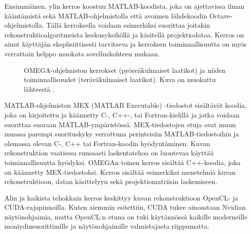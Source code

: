 Ensimmäinen, ylin kerros koostuu MATLAB-koodista, joka on ajettavissa ilman kääntämistä sekä MATLAB-ohjelmistolla että avoimen lähdekoodin Octave-ohjelmistolla. Tällä kerroksella voidaan esimerkiksi suorittaa joitakin rekonstruktioalgoritmeista keskusyksiköllä ja käsitellä projektiodataa. Kerros on ainut käyttäjän eksplisiittisesti tarvitseva ja kerroksen toiminnallisuutta on myös verrattain helppo muokata sovelluskohteen mukaan.\cite{wettenhovi_transmission_2021, wettenhovi_omegaopen-source_2021}

\begin{figure}[H]
    \centering
    \captionsetup{width=.9\textwidth}
    \resizebox{.9\linewidth}{!}{
        
    }
    \caption{OMEGA-ohjelmiston kerrokset (pyöreäkulmaiset laatikot) ja niiden toiminnallisuudet (teräväkulmaiset laatikot). Kuva on muokattu lähteestä \cite{wettenhovi_omegaopen-source_2021}.}
    \label{fig:omega-kerrokset}
\end{figure}

MATLAB-ohjelmiston MEX (MATLAB Executable) -tiedostot sisältävät koodia, joka on kirjoitettu ja käännetty C-, C++-, tai Fortran-kielillä ja jotka voidaan suorittaa suoraan MATLAB-ympäristössä. MEX-tiedostojen etuja ovat muun muassa parempi suorituskyky verrattuna perinteisiin MATLAB-tiedostoihin ja olemassa olevan C-, C++ tai Fortran-koodin hyödyntäminen. Kuvan rekonstruktion vaatiessa runsaasti laskentatehoa on luontevaa käyttää toiminnallisuutta hyödyksi. OMEGAn toinen kerros sisältää C++-koodia, joka on käännetty MEX-tiedostoksi. Kerros sisältää esimerkiksi menetelmiä kuvan rekonstruktioon, datan käsittelyyn sekä projektiomatriisin laskemiseen.\cite{wettenhovi_transmission_2021, wettenhovi_omegaopen-source_2021}

Alin ja kaikista tehokkain kerros keskittyy kuvan rekonstruktioon OpenCL- ja CUDA-rajapinnoilla\cite{wettenhovi_transmission_2021, wettenhovi_omegaopen-source_2021}. Kuten aiemmin esitettiin, CUDA tukee ainoastaan Nvidian näytönohjaimia, mutta OpenCL:n etuna on tuki käytännössä kaikille moderneille moniydinsuorittimille ja näytönohjaimille valmistajasta riippumatta\cite{stone_opencl_2010}.